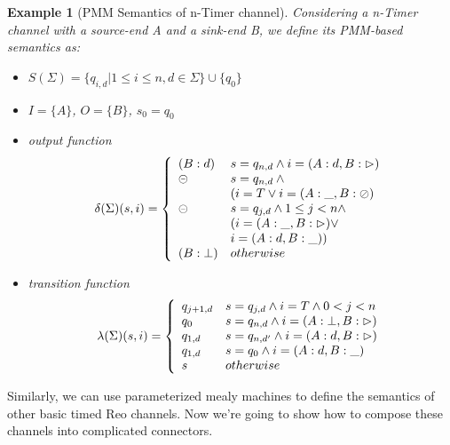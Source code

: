\documentclass[conference, a4paper]{IEEEtran}
\newtheorem{example}{Example}
\newcommand{\rblock}[0]{\circleddash}
\newcommand{\rread}[0]{\rhd}
\newcommand{\rnoread}[0]{\oslash}
\begin{document}
\begin{example}[PMM Semantics of n-Timer channel]
  Considering a n-Timer channel with a source-end A and a sink-end B, we define its PMM-based
  semantics as:
  \begin{itemize}
    \item[-] $S(\Sigma)=\{q_{i,d}|1\leq i\leq n, d\in \Sigma\}\cup\{q_0\}$
    \item[-] $I=\{A\}$, $O=\{B\}$, $s_0=q_0$
    \item[-] output function
      \begin{displaymath}
        \delta(\Sigma)(s,i)=\left\{
        \begin{array}[h]{ll}
          (B:d) & s=q_{n,d}\land i=(A:d,B:\rread)\\
          \rblock & s=q_{n,d}\:\land \\
          & (i=T\lor i=(A:\_,B:\rnoread) \\
          \rblock & s=q_{j,d}\land 1 \leq j < n\land \\
          & (i=(A:\_,B:\rread)\lor \\
          & i=(A:d,B:\_))\\
          (B:\bot) & otherwise\\
        \end{array}
        \right.
      \end{displaymath}
    \item[-] transition function
      \begin{displaymath}
        \lambda(\Sigma)(s,i)=\left\{
        \begin{array}[h]{ll}
          q_{j+1,d} & s=q_{j,d}\land i=T\land0 < j < n\\
          q_0 & s=q_{n,d}\land i=(A:\bot,B:\rread) \\
          q_{1,d} & s=q_{n,d'}\land i=(A:d,B:\rread) \\
          q_{1,d} & s=q_0 \land i=(A:d,B:\_) \\
          s & otherwise \\
        \end{array}
        \right.
      \end{displaymath}
  \end{itemize}
\end{example}

Similarly, we can use parameterized mealy machines to define the semantics of other basic timed Reo
channels. Now we're going to show how to compose these channels into complicated connectors.
\end{document}
